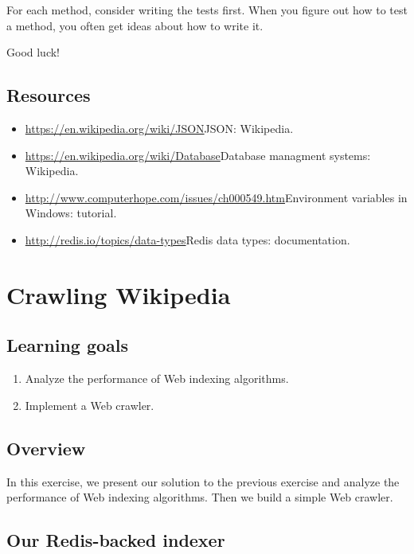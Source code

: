 \documentclass[12pt]{book}
\theoremstyle{exercise}
\begin{document}
For each method, consider writing the tests first. When you figure out
how to test a method, you often get ideas about how to write it.

Good luck!

\section{Resources}\label{resources-13}

\begin{itemize}
\itemsep1pt\parskip0pt
\item
  \url{https://en.wikipedia.org/wiki/JSON}{JSON}: Wikipedia.
\item
  \url{https://en.wikipedia.org/wiki/Database}{Database managment
  systems}: Wikipedia.
\item
  \url{http://www.computerhope.com/issues/ch000549.htm}{Environment
  variables in Windows}: tutorial.
\item
  \url{http://redis.io/topics/data-types}{Redis data types}:
  documentation. 
\end{itemize}


\chapter{Crawling Wikipedia}

\section{Learning goals}\label{learning-goals-9}

\begin{enumerate}
\def\labelenumi{\arabic{enumi}.}
\itemsep1pt\parskip0pt
\item
  Analyze the performance of Web indexing algorithms.
\item
  Implement a Web crawler.
\end{enumerate}

\section{Overview}\label{overview-17}

In this exercise, we present our solution to the previous exercise and analyze the
performance of Web indexing algorithms. Then we build a simple Web
crawler.

\section{Our Redis-backed indexer}\label{our-redis-backed-indexer}
\end{document}
